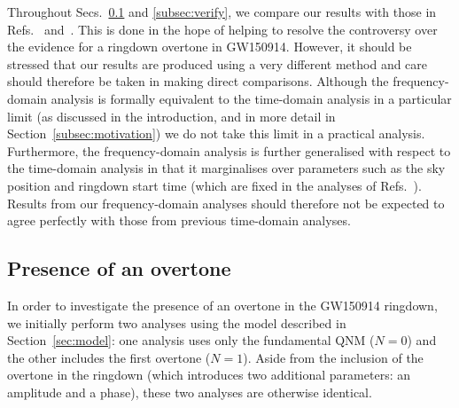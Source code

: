 Throughout Secs.~\ref{subsec:overtone} and \ref{subsec:verify}, we compare our results with those in Refs.~\cite{Cotesta:2022pci} and~\cite{Isi:2022mhy}. 
This is done in the hope of helping to resolve the controversy over the evidence for a ringdown overtone in GW150914. 
However, it should be stressed that our results are produced using a very different method and care should therefore be taken in making direct comparisons.
Although the frequency-domain analysis is formally equivalent to the time-domain analysis in a particular limit (as discussed in the introduction, and in more detail in Section~\ref{subsec:motivation}) we do not take this limit in a practical analysis. Furthermore, the frequency-domain analysis is further generalised with respect to the time-domain analysis in that it marginalises over parameters such as the sky position and ringdown start time (which are fixed in the analyses of Refs.~\cite{Cotesta:2022pci, Isi:2022mhy}).
Results from our frequency-domain analyses should therefore not be expected to agree perfectly with those from previous time-domain analyses.

\subsection{Presence of an overtone}\label{subsec:overtone}

In order to investigate the presence of an overtone in the GW150914 ringdown, we initially perform two analyses using the model described in Section~\ref{sec:model}: one analysis uses only the fundamental QNM ($N=0$) and the other includes the first overtone ($N=1$).
Aside from the inclusion of the overtone in the ringdown (which introduces two additional parameters: an amplitude and a phase), these two analyses are otherwise identical.

